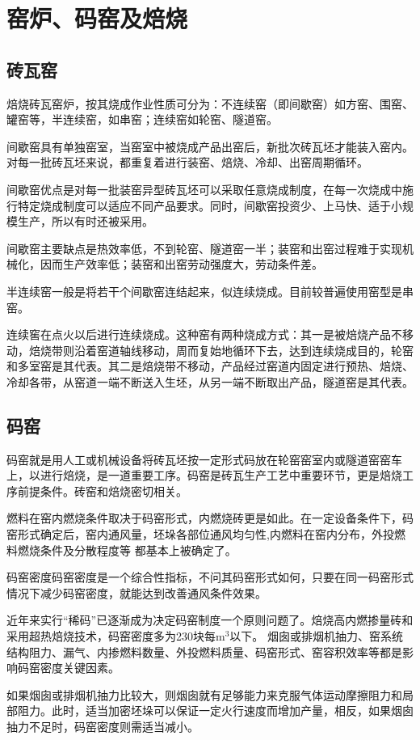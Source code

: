\documentclass{ctexbook}
\begin{document}
\section{窑炉、码窑及焙烧}
\subsection{砖瓦窑}
焙烧砖瓦窑炉，按其烧成作业性质可分为：不连续窑（即间歇窑）如方窑、围窑、罐窑等，半连续窑，如串窑；连续窑如轮窑、隧道窑。

间歇窑具有单独窑室，当窑室中被烧成产品出窑后，新批次砖瓦坯才能装入窑内。对每一批砖瓦坯来说，都重复着进行装窑、焙烧、冷却、出窑周期循环。

间歇窑优点是对每一批装窑异型砖瓦坯可以采取任意烧成制度，在每一次烧成中施行特定烧成制度可以适应不同产品要求。同时，间歇窑投资少、上马快、适于小规模生产，所以有时还被采用。

间歇窑主要缺点是热效率低，不到轮窑、隧道窑一半；装窑和出窑过程难于实现机械化，因而生产效率低；装窑和出窑劳动强度大，劳动条件差。

半连续窑一般是将若干个间歇窑连结起来，似连续烧成。目前较普遍使用窑型是串窑。

连续窖在点火以后进行连续烧成。这种窑有两种烧成方式：其一是被焙烧产品不移动，焙烧带则沿着窑道轴线移动，周而复始地循环下去，达到连续烧成目的，轮窑和多室窑是其代表。其二是焙烧带不移动，产品经过窑道内固定进行预热、焙烧、冷却各带，从窑道一端不断送入生坯，从另一端不断取出产品，隧道窑是其代表。
\subsection{码窑}
码窑就是用人工或机械设备将砖瓦坯按一定形式码放在轮窑窑室内或隧道窑窑车上，以进行焙烧，是一道重要工序。码窑是砖瓦生产工艺中重要环节，更是焙烧工序前提条件。砖窑和焙烧密切相关。

燃料在窑内燃烧条件取决于码窑形式，内燃烧砖更是如此。在一定设备条件下，码窑形式确定后，窑内通风量，坯垛各部位通风均匀性,内燃料在窑内分布，外投燃料燃烧条件及分散程度等
都基本上被确定了。

码窑密度码窑密度是一个综合性指标，不问其码窑形式如何，只要在同一码窑形式情况下减少码窑密度，就能达到改善通风条件效果。

近年来实行“稀码”已逐渐成为决定码窑制度一个原则问题了。焙烧高内燃掺量砖和采用超热焙烧技术，码窑密度多为230块每m$^3$以下。
烟囱或排烟机抽力、窑系统结构阻力、漏气、内掺燃料数量、外投燃料质量、码窑形式、窑容积效率等都是影响码窑密度关键因素。

如果烟囱或排烟机抽力比较大，则烟囱就有足够能力来克服气体运动摩擦阻力和局部阻力。此时，适当加密坯垛可以保证一定火行速度而增加产量，相反，如果烟囱抽力不足时，码窑密度则需适当减小。
\end{document}
